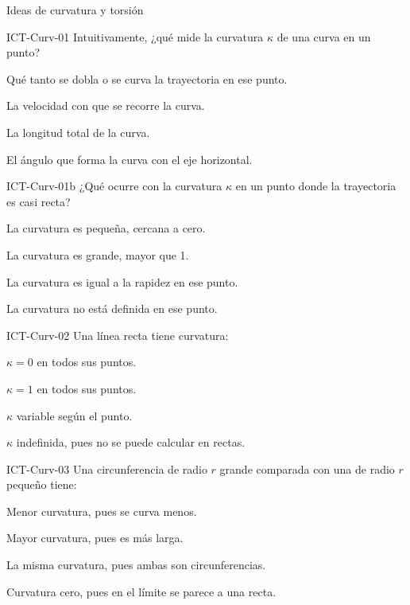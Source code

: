 \documentclass[a4,11pt]{aleph-notas}
\begin{document}
\begin{quiz}{Ideas de curvatura y torsión}

\begin{multi}[]%
    {ICT-Curv-01}
    Intuitivamente, ¿qué mide la curvatura $\kappa$ de una curva en un punto?
    \item* Qué tanto se dobla o se curva la trayectoria en ese punto.
    \item La velocidad con que se recorre la curva.
    \item La longitud total de la curva.
    \item El ángulo que forma la curva con el eje horizontal.
\end{multi}

\begin{multi}[]%
    {ICT-Curv-01b}
    ¿Qué ocurre con la curvatura $\kappa$ en un punto donde la trayectoria es casi recta?
    \item* La curvatura es pequeña, cercana a cero.
    \item La curvatura es grande, mayor que 1.
    \item La curvatura es igual a la rapidez en ese punto.
    \item La curvatura no está definida en ese punto.
\end{multi}

\begin{multi}[]%
    {ICT-Curv-02}
    Una línea recta tiene curvatura:
    \item* $\kappa=0$ en todos sus puntos.
    \item $\kappa=1$ en todos sus puntos.
    \item $\kappa$ variable según el punto.
    \item $\kappa$ indefinida, pues no se puede calcular en rectas.
\end{multi}

\begin{multi}[]%
    {ICT-Curv-03}
    Una circunferencia de radio $r$ grande comparada con una de radio $r$ pequeño tiene:
    \item* Menor curvatura, pues se curva menos.
    \item Mayor curvatura, pues es más larga.
    \item La misma curvatura, pues ambas son circunferencias.
    \item Curvatura cero, pues en el límite se parece a una recta.
\end{multi}


\end{quiz}
\end{document}
